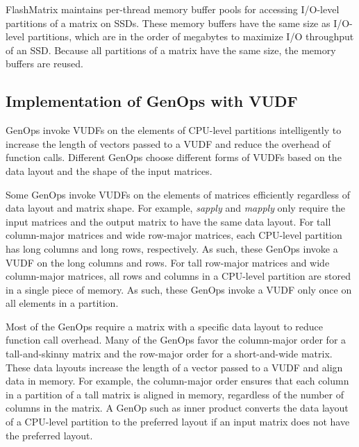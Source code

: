 FlashMatrix maintains per-thread memory buffer pools for accessing I/O-level
partitions of a matrix on SSDs. These memory buffers have the same size as
I/O-level partitions, which are in the order of megabytes to maximize I/O
throughput of an SSD. Because all partitions of a matrix have the same size,
the memory buffers are reused.

\subsection{Implementation of GenOps with VUDF}

GenOps invoke VUDFs on the elements of CPU-level partitions intelligently
to increase the length of vectors passed to a VUDF and reduce the overhead of
function calls. Different GenOps choose different
forms of VUDFs based on the data layout and the shape of the input matrices.

Some GenOps invoke VUDFs on the elements of matrices efficiently regardless of
data layout and matrix shape.
For example, \textit{sapply} and \textit{mapply} only require
the input matrices and the output matrix to have the same data layout. For tall
column-major matrices and wide row-major matrices, each CPU-level partition has
long columns and long rows, respectively. As such, these GenOps invoke a VUDF
on the long columns and rows. For tall row-major matrices and wide column-major
matrices, all rows and columns in a CPU-level partition are stored in a single
piece of memory. As such, these GenOps invoke a VUDF only once on all
elements in a partition. %

Most of the GenOps require a matrix with a specific data layout to reduce
function call overhead.
Many of the GenOps favor the column-major order for a tall-and-skinny matrix
and the row-major order for a short-and-wide matrix. These data layouts increase
the length of a vector passed to a VUDF and align data in memory. For example,
the column-major order ensures that each column in a partition of a tall matrix
is aligned in memory, regardless of the number of columns in the matrix. A GenOp
such as inner product converts the data layout of a CPU-level partition to
the preferred layout if an input matrix does not have the preferred layout.

